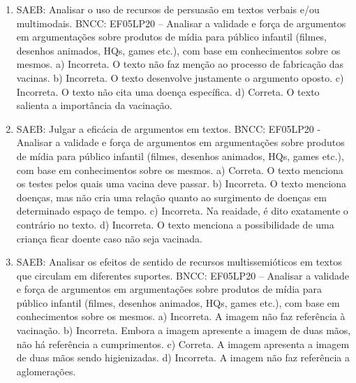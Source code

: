 \begin{enumerate}
\item
SAEB: Analisar o uso de recursos de persuasão em textos verbais e/ou
multimodais. BNCC: EF05LP20 – Analisar a validade e força de argumentos
em argumentações sobre produtos de mídia para público infantil (filmes,
desenhos animados, HQs, games etc.), com base em conhecimentos sobre os
mesmos.
a) Incorreta. O texto não faz menção ao processo de fabricação das
vacinas.
b) Incorreta. O texto desenvolve justamente o argumento oposto.
c) Incorreta. O texto não cita uma doença específica.
d) Correta. O texto salienta a importância da vacinação.

\item
SAEB: Julgar a eficácia de argumentos em textos. BNCC: EF05LP20 -
Analisar a validade e força de argumentos em argumentações sobre
produtos de mídia para público infantil (filmes, desenhos animados, HQs,
games etc.), com base em conhecimentos sobre os mesmos.
a) Correta. O texto menciona os testes pelos quais uma vacina deve
passar.
b) Incorreta. O texto menciona doenças, mas não cria uma relação quanto ao surgimento de doenças em determinado espaço de tempo.
c) Incorreta. Na reaidade, é dito exatamente o contrário no texto.
d) Incorreta. O texto menciona a possibilidade de uma criança ficar
doente caso não seja vacinada.

\item
SAEB: Analisar os efeitos de sentido de recursos multissemióticos em
textos que circulam em diferentes suportes. BNCC: EF05LP20 – Analisar a
validade e força de argumentos em argumentações sobre produtos de mídia
para público infantil (filmes, desenhos animados, HQs, games etc.), com
base em conhecimentos sobre os mesmos.
a) Incorreta. A imagem não faz referência à vacinação.
b) Incorreta. Embora a imagem apresente a imagem de duas mãos, não há
referência a cumprimentos.
c) Correta. A imagem apresenta a imagem de duas mãos sendo higienizadas.
d) Incorreta. A imagem não faz referência a aglomerações.
\end{enumerate}


